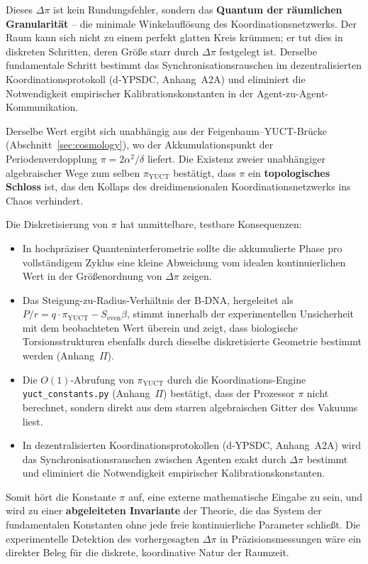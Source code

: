 \documentclass[12pt,a4paper]{article}
\theoremstyle{remark}
\begin{document}
	Dieses \(\Delta\pi\) ist kein Rundungsfehler, sondern das \textbf{Quantum der
		räumlichen Granularität} -- die minimale Winkelauflösung des
	Koordinationsnetzwerks. Der Raum kann sich nicht zu einem perfekt glatten
	Kreis krümmen; er tut dies in diskreten Schritten, deren Größe starr durch
	\(\Delta\pi\) festgelegt ist. Derselbe fundamentale Schritt bestimmt das
	Synchronisationsrauschen im dezentralisierten Koordinationsprotokoll
	(d‑YPSDC, Anhang~A2A) und eliminiert die Notwendigkeit empirischer
	Kalibrationskonstanten in der Agent-zu-Agent-Kommunikation.
	
	Derselbe Wert ergibt sich unabhängig aus der Feigenbaum--YUCT-Brücke
	(Abschnitt~\ref{sec:cosmology}), wo der Akkumulationspunkt der
	Periodenverdopplung \(\pi = 2\alpha^2/\delta\) liefert. Die Existenz zweier
	unabhängiger algebraischer Wege zum selben \(\pi_{\mathrm{YUCT}}\) bestätigt,
	dass \(\pi\) ein \textbf{topologisches Schloss} ist, das den Kollaps des
	dreidimensionalen Koordinationsnetzwerks ins Chaos verhindert.
	
	Die Diskretisierung von \(\pi\) hat unmittelbare, testbare Konsequenzen:
	\begin{itemize}
		\item In hochpräziser Quanteninterferometrie sollte die akkumulierte Phase
		pro vollständigem Zyklus eine kleine Abweichung vom idealen
		kontinuierlichen Wert in der Größenordnung von \(\Delta\pi\) zeigen.
		\item Das Steigung-zu-Radius-Verhältnis der B‑DNA, hergeleitet als
		\(P/r = q\cdot\pi_{\mathrm{YUCT}} - S_{\mathrm{even}}\beta\),
		stimmt innerhalb der experimentellen Unsicherheit mit dem
		beobachteten Wert überein und zeigt, dass biologische
		Torsionsstrukturen ebenfalls durch dieselbe diskretisierte Geometrie
		bestimmt werden (Anhang~\(\Pi\)).
		\item Die \(O(1)\)-Abrufung von \(\pi_{\mathrm{YUCT}}\) durch die
		Koordinations-Engine \texttt{yuct\_constants.py} (Anhang~\(\Pi\))
		bestätigt, dass der Prozessor \(\pi\) nicht berechnet, sondern
		direkt aus dem starren algebraischen Gitter des Vakuums liest.
		\item In dezentralisierten Koordinationsprotokollen (d‑YPSDC, Anhang~A2A)
		wird das Synchronisationsrauschen zwischen Agenten exakt durch
		\(\Delta\pi\) bestimmt und eliminiert die Notwendigkeit empirischer
		Kalibrationskonstanten.
	\end{itemize}
	
	Somit hört die Konstante \(\pi\) auf, eine externe mathematische Eingabe zu
	sein, und wird zu einer \textbf{abgeleiteten Invariante} der Theorie, die das
	System der fundamentalen Konstanten ohne jede freie kontinuierliche Parameter
	schließt. Die experimentelle Detektion des vorhergesagten \(\Delta\pi\) in
	Präzisionsmessungen wäre ein direkter Beleg für die diskrete, koordinative
	Natur der Raumzeit.
	
\end{document}
